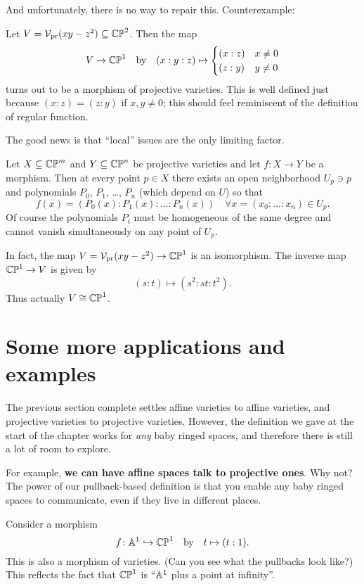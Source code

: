 And unfortunately, there is no way to repair this.
Counterexample:
\begin{example}
	Let $V = \mathcal V_{\text{pr}}(xy-z^2) \subseteq \mathbb{CP}^2$.
	Then the map
	\[
		V \to \mathbb{CP}^1
		\quad\text{by}\quad
		(x:y:z)
		\mapsto
		\begin{cases}
			(x:z) & x \neq 0 \\
			(z:y) & y \neq 0
		\end{cases}
	\]
	turns out to be a morphism of projective varieties.
	This is well defined just because $(x:z) = (z:y)$ if $x,y \neq 0$;
	this should feel reminiscent of the definition of regular function.
\end{example}
The good news is that ``local'' issues are the only limiting factor.
\begin{theorem}
	Let $X \subseteq \mathbb{CP}^m$ and $Y \subseteq \mathbb{CP}^n$ be projective varieties
	and let $f \colon  X \to Y$ be a morphism.
	Then at every point $p \in X$ there exists
	an open neighborhood $U_p \ni p$
	and polynomials $P_0$, $P_1$, \dots, $P_n$ (which depend on $U$) so that
	\[ f(x) = \left( P_0(x) : P_1(x) : \dots : P_n(x) \right)
		\quad \forall x = (x_0 : \dots : x_n) \in U_p. \]
	Of course the polynomials $P_i$ must be homogeneous of the same degree
	and cannot vanish simultaneously on any point of $U_p$.
\end{theorem}
\begin{example}
	In fact, the map $V = \mathcal V_{\text{pr}}(xy-z^2) \to \mathbb{CP}^1$ is an isomorphism.
	The inverse map $\mathbb{CP}^1 \to V$ is given by
	\[ (s:t) \mapsto (s^2:st:t^2). \]
	Thus actually $V \cong \mathbb{CP}^1$.
\end{example}

\section{Some more applications and examples}
The previous section complete settles affine varieties to affine varieties,
and projective varieties to projective varieties.
However, the definition we gave at the start of the chapter
works for \emph{any} baby ringed spaces,
and therefore there is still a lot of room to explore.

For example, \textbf{we can have affine spaces talk to projective ones}.
Why not?
The power of our pullback-based definition
is that you enable any baby ringed spaces to communicate,
even if they live in different places.
\begin{example}
	Consider a morphism
	\[ f \colon \mathbb A^1 \hookrightarrow \mathbb{CP}^1 \quad\text{by}\quad t \mapsto (t:1).  \]
	This is also a morphism of varieties.
	(Can you see what the pullbacks look like?)
	This reflects the fact that $\mathbb{CP}^1$ is ``$\mathbb A^1$ plus a point at infinity''.
\end{example}

